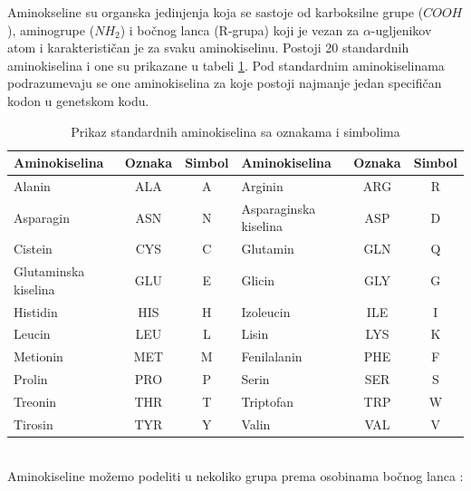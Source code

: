 Aminokseline su organska jedinjenja koja se sastoje od karboksilne grupe ($COOH$), aminogrupe ($NH_2$) i bočnog lanca (R-grupa) koji je vezan za $\alpha$-ugljenikov atom i karakterističan je za svaku aminokiselinu. Postoji 20 standardnih aminokiselina i one su prikazane u tabeli \ref{tab: aminoacids}. Pod standardnim aminokiselinama podrazumevaju se one aminokiselina za koje postoji najmanje jedan specifičan kodon u genetskom kodu. \cite{biochemestry5, biohUdz, straus}


\begin{table}
	\centering
	\caption{Prikaz standardnih aminokiselina sa oznakama i simbolima}
	\label{tab: aminoacids}
	\begin{tabular}{|lcc|lcc|}
		\hline
		Aminokiselina & Oznaka & Simbol & Aminokiselina & Oznaka & Simbol \\
		\hline
		Alanin & ALA & A & Arginin & ARG & R  \\
		Asparagin & ASN & N & Asparaginska kiselina & ASP & D \\
		Cistein & CYS & C & Glutamin & GLN & Q  \\
		Glutaminska kiselina & GLU & E & Glicin & GLY & G  \\
		Histidin & HIS & H & Izoleucin & ILE & I  \\
		Leucin & LEU & L & Lisin & LYS & K  \\
		Metionin & MET & M & Fenilalanin & PHE & F  \\
		Prolin & PRO & P & Serin & SER & S  \\
		Treonin & THR & T & Triptofan & TRP & W  \\
		Tirosin & TYR & Y & Valin & VAL & V \\
		\hline             
	\end{tabular}
\end{table}

~ \\
\noindent Aminokiseline možemo podeliti u nekoliko grupa prema osobinama bočnog lanca \cite{bioinf, biochemestry5, biohUdz}:

